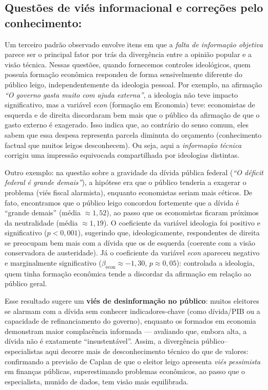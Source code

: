 \subsection{Questões de viés informacional e correções pelo conhecimento:} 

Um terceiro padrão observado envolve itens em que a \emph{falta de informação objetiva} parece ser o principal fator por trás da divergência entre a opinião popular e a visão técnica. Nessas questões, quando fornecemos controles ideológicos, quem possuía formação econômica respondeu de forma sensivelmente diferente do público leigo, independentemente da ideologia pessoal. Por exemplo, na afirmação \emph{“O governo gasta muito com ajuda externa”}, a ideologia não teve impacto significativo, mas a variável \emph{econ} (formação em Economia) teve: economistas de esquerda e de direita discordaram bem mais que o público da afirmação de que o gasto externo é exagerado. Isso indica que, ao contrário do senso comum, eles sabem que essa despesa representa parcela diminuta do orçamento (conhecimento factual que muitos leigos desconhecem). Ou seja, aqui a \emph{informação técnica} corrigiu uma impressão equivocada compartilhada por ideologias distintas. 

Outro exemplo: na questão sobre a gravidade da dívida pública federal (\emph{“O déficit federal é grande demais”}), a hipótese era que o público tenderia a exagerar o problema (viés fiscal alarmista), enquanto economistas seriam mais céticos. De fato, encontramos que o público leigo concordou fortemente que a dívida é “grande demais” (média $\approx 1{,}52$), ao passo que os economistas ficaram próximos da neutralidade (média $\approx 1{,}19$). O coeficiente da variável ideologia foi positivo e significativo ($p<0{,}001$), sugerindo que, ideologicamente, respondentes de direita se preocupam bem mais com a dívida que os de esquerda (coerente com a visão conservadora de austeridade). Já o coeficiente da variável \emph{econ} apareceu negativo e marginalmente significativo ($\beta_{\text{econ}} \approx -1{,}30$, $p \approx 0{,}05$): controlada a ideologia, quem tinha formação econômica tende a discordar da afirmação em relação ao público geral. 

Esse resultado sugere um \textbf{viés de desinformação no público}: muitos eleitores se alarmam com a dívida sem conhecer indicadores-chave (como dívida/PIB ou a capacidade de refinanciamento do governo), enquanto os formados em economia demonstram maior complacência informada — avaliando que, embora alta, a dívida não é exatamente “insustentável”. Assim, a divergência público–especialistas aqui decorre mais de desconhecimento técnico do que de valores: confirmando a previsão de Caplan de que o eleitor leigo apresenta \emph{viés pessimista} em finanças públicas, superestimando problemas econômicos, ao passo que o especialista, munido de dados, tem visão mais equilibrada.

